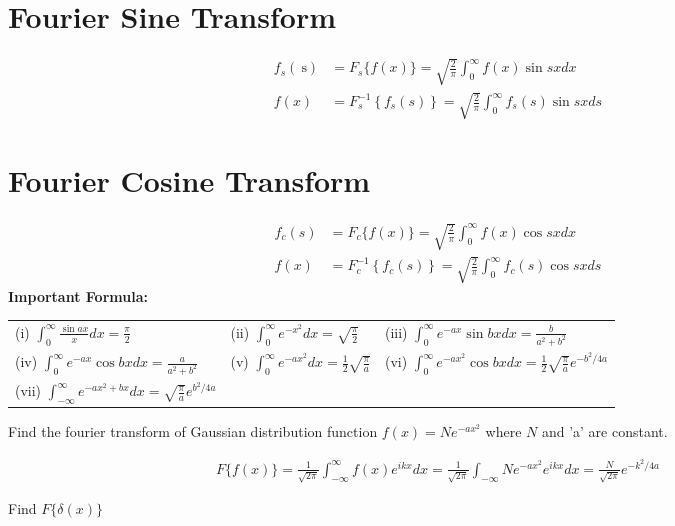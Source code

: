\section{Fourier Sine Transform}
\begin{align*}
f_{s}(\mathrm{~s})&=F_{s}\{f(x)\}=\sqrt{\frac{2}{\pi}} \int_{0}^{\infty} f(x) \sin s x d x \\
f(x)&=F_{s}^{-1}\left\{f_{s}(s)\right\}=\sqrt{\frac{2}{\pi}} \int_{0}^{\infty} f_{s}(s) \sin s x d s
\end{align*}
\section{Fourier Cosine Transform}
\begin{align*}
f_{c}(s)&=F_{c}\{f(x)\}=\sqrt{\frac{2}{\pi}} \int_{0}^{\infty} f(x) \cos s x d x \\
f(x)&=F_{c}^{-1}\left\{f_{c}(s)\right\}=\sqrt{\frac{2}{\pi}} \int_{0}^{\infty} f_{c}(s) \cos s x d s
\end{align*}
\textbf{Important Formula:}\\
\renewcommand*{\arraystretch}{2}
\begin{tabular}{p{5cm}p{5cm}p{6cm}}
	(i) $\int_{0}^{\infty} \frac{\sin a x}{x} d x=\frac{\pi}{2}$&
	(ii) $\int_{0}^{\infty} e^{-x^{2}} d x=\sqrt{\frac{\pi}{2}}$&
	(iii) $\int_{0}^{\infty} e^{-a x} \sin b x d x=\frac{b}{a^{2}+b^{2}}$\\
	(iv) $\int_{0}^{\infty} e^{-a x} \cos b x d x=\frac{a}{a^{2}+b^{2}}$&
	(v) $\int_{0}^{\infty} e^{-a x^{2}} d x=\frac{1}{2} \sqrt{\frac{\pi}{a}}$&
	(vi) $\int_{0}^{\infty} e^{-a x^{2}} \cos b x d x=\frac{1}{2} \sqrt{\frac{\pi}{a}} e^{-b^{2} / 4 a}$\\
	(vii)
	$\int_{-\infty}^{\infty} e^{-a x^{2}+b x} d x=\sqrt{\frac{\pi}{a}} e^{b^{2} / 4 a}$& & 
\end{tabular}
\begin{exercise}
	Find the fourier transform of Gaussian distribution function $f(x)=N e^{-a x^{2}}$ where $N$ and 'a' are constant.
\end{exercise}
\begin{answer}
	\begin{align*}
	F\{f(x)\}=\frac{1}{\sqrt{2 \pi}} \int_{-\infty}^{\infty} f(x) e^{i k x} d x=\frac{1}{\sqrt{2 \pi}} \int_{-\infty} N e^{-a x^{2}} e^{i k x} d x=\frac{N}{\sqrt{2 \pi}} e^{-k^{2} / 4 a}
	\end{align*}
\end{answer}
\begin{exercise}
	Find $F\{\delta(x)\}$
\end{exercise}

